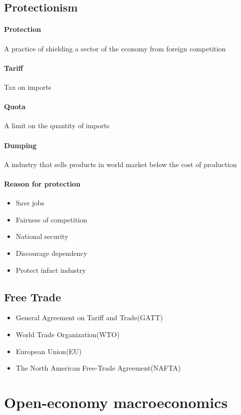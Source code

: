 \documentclass[11pt]{article}
\begin{document}
\subsection{Protectionism}
\paragraph{Protection}
A practice of shielding a sector of the economy from foreign competition
\paragraph{Tariff}
Tax on imports
\paragraph{Quota}
A limit on the quantity of imports
\paragraph{Dumping}
A industry that sells products in world market below the cost of production
\paragraph{Reason for protection}
\begin{itemize}
    \item Save jobs
    \item Fairness of competition
    \item National security
    \item Discourage dependency
    \item Protect infact industry
\end{itemize}
\subsection{Free Trade}
\begin{itemize}
    \item General Agreement on Tariff and Trade(GATT)
    \item World Trade Organization(WTO)
    \item European Union(EU)
    \item The North American Free-Trade Agreement(NAFTA)
\end{itemize}

\section{Open-economy macroeconomics}
\end{document}
